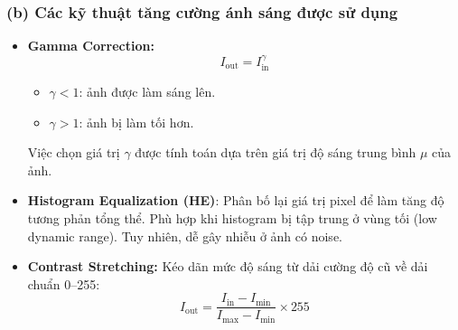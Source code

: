 \subsubsection*{(b) Các kỹ thuật tăng cường ánh sáng được sử dụng}
\begin{itemize}[]
    \item \textbf{Gamma Correction:}
    \[ I_{\text{out}} = I_{\text{in}}^{\gamma} \]
    \begin{itemize}[]
        \item $\gamma < 1$: ảnh được làm sáng lên.
        \item $\gamma > 1$: ảnh bị làm tối hơn.
    \end{itemize}
    Việc chọn giá trị $\gamma$ được tính toán dựa trên giá trị độ sáng trung bình $\mu$ của ảnh.

    \item \textbf{Histogram Equalization (HE)}:
    Phân bố lại giá trị pixel để làm tăng độ tương phản tổng thể. Phù hợp khi histogram bị tập trung ở vùng tối (low dynamic range). Tuy nhiên, dễ gây nhiễu ở ảnh có noise.

    \item \textbf{Contrast Stretching:}
    Kéo dãn mức độ sáng từ dải cường độ cũ về dải chuẩn 0--255:
    \[ I_{\text{out}} = \frac{I_{\text{in}} - I_{\min}}{I_{\max} - I_{\min}} \times 255 \]
    


\end{itemize}

